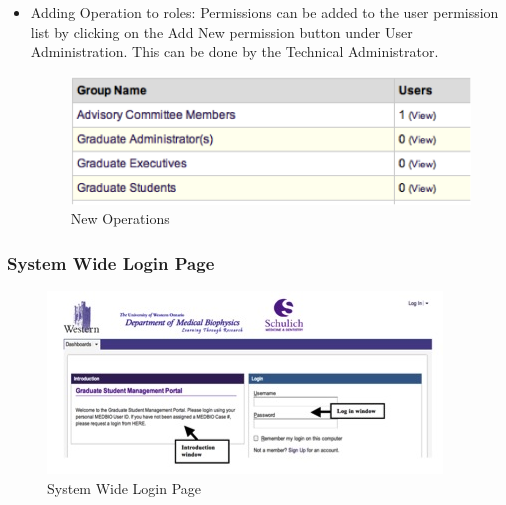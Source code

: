 \documentclass[11pt,a4paper]{report}
\begin{document}
\begin{itemize}
\begin{itemize}
\item Adding Operation to roles: Permissions can be added to the user permission list by clicking on the Add New permission button under User Administration. This can be done by the Technical Administrator.

\begin{figure}[htp]
\centering
\includegraphics[scale=1]{diagrams/HTMLTemplating/Figure9.png}
\caption{New Operations}
\label{fig:NewPermission}
\end{figure}


\end{itemize}
\end{itemize}

\subsubsection{System Wide Login Page}

\begin{figure}[htp]
\centering
\includegraphics[scale=1]{diagrams/HTMLTemplating/Figure1.jpg}
\caption{System Wide Login Page}
\label{fig:SystemWideLogin}
\end{figure}
\end{document}
